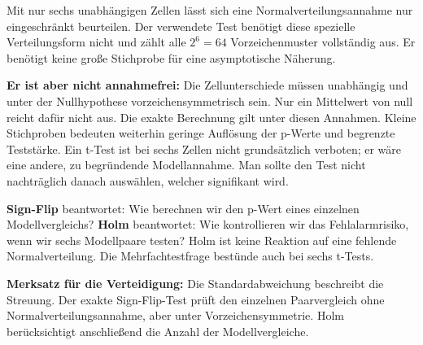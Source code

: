 Mit nur sechs unabhängigen Zellen lässt sich eine Normalverteilungsannahme nur eingeschränkt beurteilen. Der verwendete Test benötigt diese spezielle Verteilungsform nicht und zählt alle $2^6=64$ Vorzeichenmuster vollständig aus. Er benötigt keine große Stichprobe für eine asymptotische Näherung.

\textbf{Er ist aber nicht annahmefrei:} Die Zellunterschiede müssen unabhängig und unter der Nullhypothese vorzeichensymmetrisch sein. Nur ein Mittelwert von null reicht dafür nicht aus. Die exakte Berechnung gilt unter diesen Annahmen. Kleine Stichproben bedeuten weiterhin geringe Auflösung der p-Werte und begrenzte Teststärke. Ein t-Test ist bei sechs Zellen nicht grundsätzlich verboten; er wäre eine andere, zu begründende Modellannahme. Man sollte den Test nicht nachträglich danach auswählen, welcher signifikant wird.

\textbf{Sign-Flip} beantwortet: Wie berechnen wir den p-Wert eines einzelnen Modellvergleichs? \textbf{Holm} beantwortet: Wie kontrollieren wir das Fehlalarmrisiko, wenn wir sechs Modellpaare testen? Holm ist keine Reaktion auf eine fehlende Normalverteilung. Die Mehrfachtestfrage bestünde auch bei sechs t-Tests.

\textbf{Merksatz für die Verteidigung:} Die Standardabweichung beschreibt die Streuung. Der exakte Sign-Flip-Test prüft den einzelnen Paarvergleich ohne Normalverteilungsannahme, aber unter Vorzeichensymmetrie. Holm berücksichtigt anschließend die Anzahl der Modellvergleiche.
\clearpage
